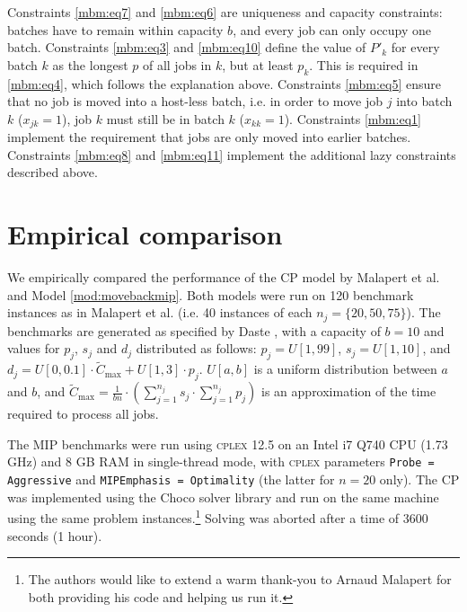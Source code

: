 \documentclass[oribibl]{llncs}
\begin{document}
Constraints \eqref{mbm:eq7} and \eqref{mbm:eq6} are uniqueness and
capacity constraints: batches have to remain within capacity $b$, and every
job can only occupy one batch. Constraints \eqref{mbm:eq3} and \eqref{mbm:eq10} define the value of
$P'_k$ for every batch $k$ as the longest $p$ of all jobs in $k$, but
at least $p_k$. This is required in \eqref{mbm:eq4}, which follows the
explanation above. Constraints \eqref{mbm:eq5} ensure that no job is moved into a host-less batch,
i.e. in order to move job $j$ into batch $k$ ($x_{jk} = 1$), job $k$ must still
be in batch $k$ ($x_{kk} = 1$). Constraints \eqref{mbm:eq1} implement the requirement that jobs are only moved
into earlier batches. Constraints \eqref{mbm:eq8} and \eqref{mbm:eq11} implement the additional lazy
constraints described above.

\section{Empirical comparison}
\label{sec:exp}

We empirically compared the performance of the CP model by Malapert et al. and
Model \ref{mod:movebackmip}. Both models were run on 120
benchmark instances as in Malapert et al. (i.e. 40 instances of each $n_j = \{20,
50, 75\}$). The benchmarks are generated as specified by Daste \cite{Daste1}, with a
capacity of $b = 10$ and values for $p_j$, $s_j$ and $d_j$ distributed as follows: $p_j = U[1, 99]$,
$s_j = U[1, 10]$, and $d_j = U[0, 0.1] \cdot \tilde{C}_\text{max} + U[1, 3] \cdot p_j$.
$U[a, b]$ is a uniform distribution between $a$ and $b$, and
$\tilde{C}_\text{max} = \frac{1}{bn} \cdot \left( \sum_{j=1}^{n_j} s_j \cdot \sum_{j=1}^{n_j}
p_j \right)$ is an approximation of the time required to process
all jobs.

The MIP benchmarks were run using \textsc{cplex} 12.5 \cite{cplex} on an Intel
i7 Q740 CPU (1.73 GHz) and 8 GB RAM in single-thread mode, with \textsc{cplex}
parameters \texttt{Probe = Aggressive} and \texttt{MIPEmphasis = Optimality}
(the latter for $n=20$ only). The CP was implemented using the Choco solver library \cite{choco} and run on the same
machine using the same problem instances.\footnote{The authors would like to extend a warm
  thank-you to Arnaud Malapert for both providing his code and helping us run
it.}
Solving was aborted after a time of 3600 seconds (1 hour).
\end{document}
